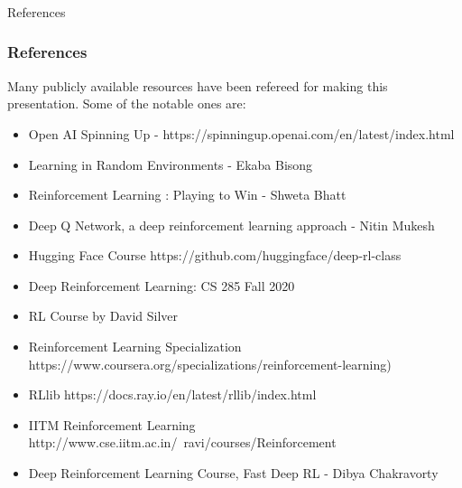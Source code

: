 \begin{frame}[fragile]\frametitle{}
\begin{center}
{\Large References}
\end{center}
\end{frame}

\begin{frame}\frametitle{References}
Many publicly available resources have been refereed for making this presentation. Some of the notable ones are:
\footnotesize
\begin{itemize}
\item Open AI Spinning Up - https://spinningup.openai.com/en/latest/index.html
\item Learning in Random Environments - Ekaba Bisong
\item Reinforcement Learning : Playing to Win - Shweta Bhatt
\item Deep Q Network, a deep reinforcement learning approach - Nitin Mukesh
\item Hugging Face Course https://github.com/huggingface/deep-rl-class
\item Deep Reinforcement Learning: CS 285 Fall 2020
\item RL Course by David Silver
\item Reinforcement Learning Specialization https://www.coursera.org/specializations/reinforcement-learning)
\item RLlib https://docs.ray.io/en/latest/rllib/index.html
\item IITM Reinforcement Learning http://www.cse.iitm.ac.in/~ravi/courses/Reinforcement%
\item Deep Reinforcement Learning Course, Fast Deep RL - Dibya Chakravorty
\end{itemize}
\end{frame}
